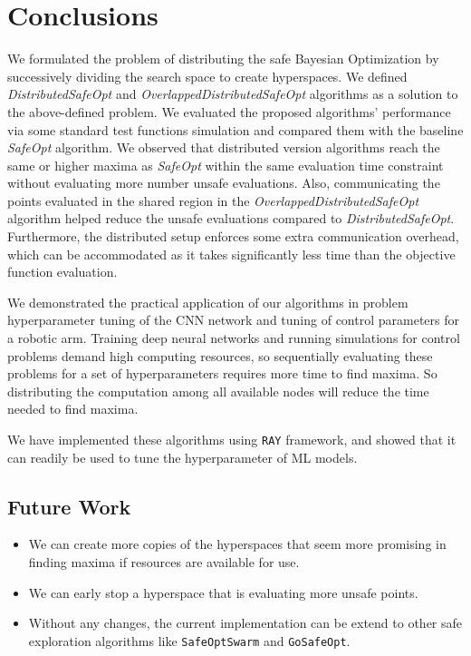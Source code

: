 \chapter{Conclusions}
\label{ch:conclusions}

We formulated the problem of distributing the safe Bayesian Optimization by successively dividing the search space to create hyperspaces. We defined \emph{DistributedSafeOpt} and \emph{OverlappedDistributedSafeOpt} algorithms as a solution to the above-defined problem. We evaluated the proposed algorithms' performance via some standard test functions simulation and compared them with the baseline \emph{SafeOpt} algorithm.
We observed that distributed version algorithms reach the same or higher maxima as \emph{SafeOpt} within the same evaluation time constraint without evaluating more number unsafe evaluations. Also, communicating the points evaluated in the shared region in the \emph{OverlappedDistributedSafeOpt} algorithm helped reduce the unsafe evaluations compared to \emph{DistributedSafeOpt}. Furthermore, the distributed setup enforces some extra communication overhead, which can be accommodated as it takes significantly less time than the objective function evaluation.

We demonstrated the practical application of our algorithms in problem hyperparameter tuning of the CNN network and tuning of control parameters for a robotic arm. Training deep neural networks and running simulations for control problems demand high computing resources, so sequentially evaluating these problems for a set of hyperparameters requires more time to find maxima. So distributing the computation among all available nodes will reduce the time needed to find maxima.

We have implemented these algorithms using \texttt{RAY} framework, and showed that it can readily be used to  tune the hyperparameter of ML models.

\section{Future Work}
\begin{itemize}
	\item We can create more copies of the hyperspaces that seem more promising in finding maxima if resources are available for use.
	\item We can early stop a hyperspace that is evaluating more unsafe points.
	\item Without any changes, the current implementation can be extend to other safe exploration algorithms like \texttt{SafeOptSwarm} and \texttt{GoSafeOpt}.
\end{itemize}